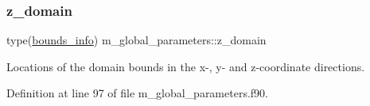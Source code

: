 \subsubsection{\texorpdfstring{z\+\_\+domain}{z\_domain}}
{\footnotesize\ttfamily type(\hyperlink{structm__derived__types_1_1bounds__info}{bounds\+\_\+info}) m\+\_\+global\+\_\+parameters\+::z\+\_\+domain}



Locations of the domain bounds in the x-\/, y-\/ and z-\/coordinate directions. 



Definition at line 97 of file m\+\_\+global\+\_\+parameters.\+f90.

